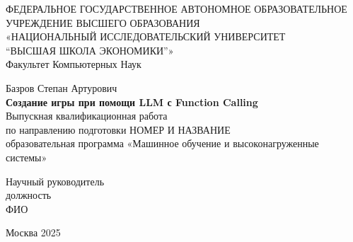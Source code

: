 \documentclass[14pt]{extarticle}
\begin{document}
	\begin{titlepage}
		\begin{center}
			{\normalsize{ФЕДЕРАЛЬНОЕ ГОСУДАРСТВЕННОЕ АВТОНОМНОЕ ОБРАЗОВАТЕЛЬНОЕ УЧРЕЖДЕНИЕ ВЫСШЕГО ОБРАЗОВАНИЯ}}\\
                \vspace{0.1cm}
			{\normalsize{«НАЦИОНАЛЬНЫЙ ИССЛЕДОВАТЕЛЬСКИЙ УНИВЕРСИТЕТ \\ “ВЫСШАЯ ШКОЛА ЭКОНОМИКИ”»}}\\
			\vspace{1cm}
			{\normalsize{Факультет Компьютерных Наук}}\\
                \vspace{1.5cm}
                

                {\normalsize{Базров Степан Артурович}}\\
                \vspace{0.15cm}
			{\normalsize{\textbf{Создание игры при помощи LLM с Function Calling}}}\\ 
                \vspace{0.15cm}
                {\normalsize{Выпускная квалификационная работа}}\\
                {\normalsize{по направлению подготовки НОМЕР И НАЗВАНИЕ}}\\
                {\normalsize{образовательная программа «Машинное обучение и высоконагруженные системы»}} \\
            \end{center}
        \vspace{4.2cm}
        \begin{minipage}{0.4\textwidth}
        \hfill
	\end{minipage}
	\hspace{2cm}
	\begin{minipage}{0.4\textwidth}
		\begin{flushleft}
			{\normalsize{{Научный руководитель}}}\\
                {\normalsize{должность}}\\
                {\normalsize{ФИО}} \\
		\end{flushleft}
	\end{minipage}
            \vspace{4.0cm}
        \begin{center}
            Москва 2025
        \end{center}
        \restoregeometry
	\end{titlepage}
\tableofcontents
\newpage
\end{document}
